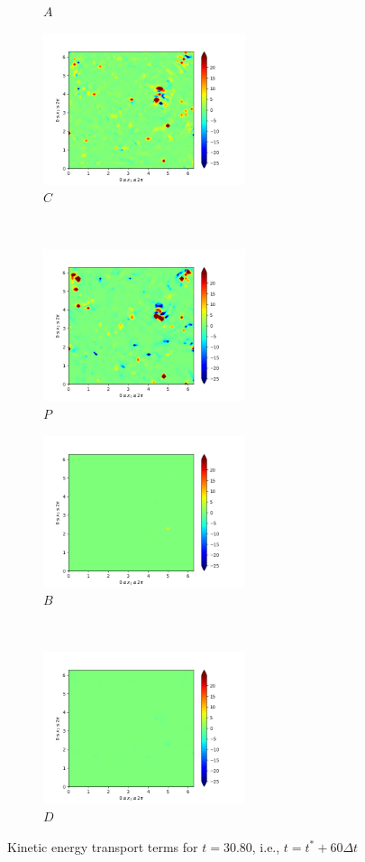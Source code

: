 \begin{figure}[H]
\begin{subfigure}{0.45\textwidth}
        \caption{$A$}
    \end{subfigure}
    \newline
    \begin{subfigure}{0.45\textwidth}
        \includegraphics[height=1.75in]{media/run-cds-65/C-ke-1400.png}
        \caption{$C$}
    \end{subfigure}
    ~
    \begin{subfigure}{0.45\textwidth}
        \includegraphics[height=1.75in]{media/run-cds-65/P-ke-1400.png}
        \caption{$P$}
    \end{subfigure}
    \newline
    \begin{subfigure}{0.45\textwidth}
        \includegraphics[height=1.75in]{media/run-cds-65/B-ke-1400.png}
        \caption{$B$}
    \end{subfigure}
    ~
    \begin{subfigure}{0.45\textwidth}
        \includegraphics[height=1.75in]{media/run-cds-65/D-ke-1400.png}
        \caption{$D$}
    \end{subfigure}
    \caption{Kinetic energy transport terms for $t=30.80$, i.e., $t=t^{\ast} + 60 \Delta t$}
\end{figure}
